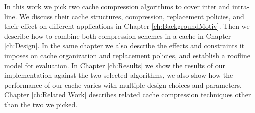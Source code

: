 In this work we pick two cache compression algorithms to cover inter and intra-line. We discuss their cache structures, compression, replacement policies, and their effect on different applications in Chapter \ref{ch:BackgroundMotiv}. Then we describe how to combine both compression schemes in a cache in Chapter \ref{ch:Design}. In the same chapter we also describe the effects and constraints it imposes on cache organization and replacement policies, and establish a roofline model for evaluation. In Chapter \ref{ch:Results} we show the results of our implementation against the two selected algorithms, we also show how the performance of our cache varies with multiple design choices and parameters. Chapter \ref{ch:Related Work} describes related cache compression techniques other than the two we picked.